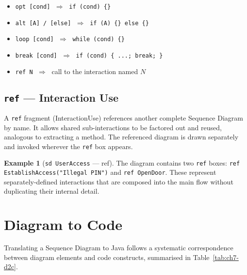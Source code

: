 \documentclass[11pt, a4paper, notitlepage]{report}
\theoremstyle{definition}
\theoremstyle{remark}
\theoremstyle{definition}
\newtheorem{example}[theorem]{Example}
\begin{document}
\begin{keyresult}[title={Key Result: Fragment Operator Summary}]
\begin{itemize}
  \item \texttt{opt [cond]} $\;\Longrightarrow\;$ \texttt{if (cond) \{\}}
  \item \texttt{alt [A] / [else]} $\;\Longrightarrow\;$ \texttt{if (A) \{\} else \{\}}
  \item \texttt{loop [cond]} $\;\Longrightarrow\;$ \texttt{while (cond) \{\}}
  \item \texttt{break [cond]} $\;\Longrightarrow\;$ \texttt{if (cond) \{ ...; break; \}}
  \item \texttt{ref N} $\;\Longrightarrow\;$ call to the interaction named $N$
\end{itemize}
\end{keyresult}

\subsection{\texttt{ref} --- Interaction Use}
\label{subsec:ch7-ref}

A \texttt{ref} fragment (InteractionUse) references another complete Sequence
Diagram by name. It allows shared sub-interactions to be factored out and
reused, analogous to extracting a method. The referenced diagram is drawn
separately and invoked wherever the \texttt{ref} box appears.

\begin{example}[\texttt{sd UserAccess} --- ref]
\label{ex:ch7-ref}
The diagram contains two \texttt{ref} boxes: \texttt{ref EstablishAccess("Illegal PIN")}
and \texttt{ref OpenDoor}. These represent separately-defined interactions that are
composed into the main flow without duplicating their internal detail.
\end{example}

\section{Diagram to Code}
\label{sec:ch7-diagram-to-code}

Translating a Sequence Diagram to Java follows a systematic correspondence
between diagram elements and code constructs, summarised in
Table~\ref{tab:ch7-d2c}.
\end{document}
